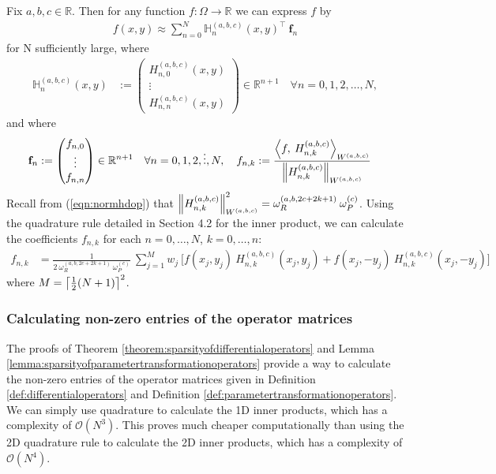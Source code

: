 \documentclass[11pt, oneside]{article}   	%
\newcommand{\bigO}{\mathcal{O}}
\newcommand{\half}{\frac{1}{2}}
\newcommand{\R}{\mathbb{R}}
\newcommand{\hdop}{H}
\newcommand{\bighdop}{\mathbb{\hdop}}
\newcommand{\hdopnk}{\hdop_{n,k}}
\newcommand{\genjac}{R}
\newcommand{\normgenjac}{\omega_\genjac}
\newcommand{\normjac}{\omega_P}
\newcommand{\hdopnkabc}{\hdop_{n,k}^{(a,b,c)}}
\newcommand{\Wabc}{{W^{(a,b,c)}}}
\begin{document}
Fix \(a,b,c \in \R\). Then for any function \(f : \Omega \to \R\) we can express \(f\) by
\begin{align*}
	f(x,y) \approx \sum_{n=0}^N \bighdop_n^{(a,b,c)}(x,y)^\top \: \mathbf{f}_n
\end{align*}
for N sufficiently large, where
\begin{align*}
	\bighdop^{(a,b,c)}_n(x,y) &:= \begin{pmatrix}
		\hdop^{(a,b,c)}_{n,0}(x,y) \\
		\vdots \\
		\hdop^{(a,b,c)}_{n,n}(x,y)
	\end{pmatrix} \in \R^{n+1} \quad \forall n = 0,1,2,\dots,N,
\end{align*}
and where
\begin{align*}
	\mathbf{f}_n &:= \begin{pmatrix}
		f_{n,0} \\
		\vdots \\
		f_{n,n}
	\end{pmatrix} \in \R^{n+1} \quad \forall n = 0,1,2,\dots,N, \quad
	f_{n,k} := \frac{\ip< f, \: \hdopnk^{(a,b,c)}>_{\Wabc}}{\norm{\hdopnk^{(a,b,c)}}_{\Wabc}}
\end{align*}
Recall from (\ref{eqn:normhdop}) that $\norm{\hdopnkabc}^2_\Wabc = \normgenjac^{(a,b,2c+2k+1)} \: \normjac^{(c)}$. Using the quadrature rule detailed in Section 4.2 for the inner product, we can calculate the coefficients $f_{n,k}$ for each $n = 0,\dots,N$, $k = 0,\dots,n$: 
\begin{align*}
	f_{n,k} &= \frac{1}{2 \: \normgenjac^{(a,b,2c+2k+1)} \: \normjac^{(c)}} \: \sum_{j=1}^{M} w_j \: \big[ f(x_j, y_j) \: \hdopnkabc(x_j, y_j) +f(x_j, -y_j) \: \hdopnkabc(x_j, -y_j) \big]
\end{align*}
where $M = \ceil{\half(N+1)}^2$.


\subsubsection{Calculating non-zero entries of the operator matrices}\label{subsection:Computation-operatormatrices}

The proofs of Theorem \ref{theorem:sparsityofdifferentialoperators} and Lemma \ref{lemma:sparsityofparametertransformationoperators} provide a way to calculate the non-zero entries of the operator matrices given in Definition \ref{def:differentialoperators} and Definition \ref{def:parametertransformationoperators}. We can simply use quadrature to calculate the 1D inner products, which has a complexity of $\bigO(N^3)$. This proves much cheaper computationally than using the 2D quadrature rule to calculate the 2D inner products, which has a complexity of $\bigO(N^4)$. 
\end{document}
